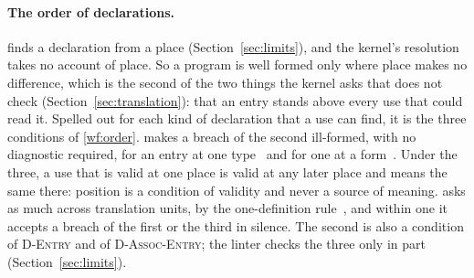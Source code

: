 \paragraph{The order of declarations.}
\label{app:fjlt:order}
\Cpp{} finds a declaration from a place (Section~\ref{sec:limits}), and the kernel's resolution takes no account of place.
So a program is well formed only where place makes no difference, which is the second of the two things the kernel asks that \Cpp{} does not check (Section~\ref{sec:translation}): that an entry stands above every use that could read it.
Spelled out for each kind of declaration that a use can find, it is the three conditions of \ref{wf:order}.
\Cpp{} makes a breach of the second ill-formed, with no diagnostic required, for an entry at one type~\cite[{\texttt{temp.expl.spec}}]{cpp23standard} and for one at a form~\cite[{\texttt{temp.spec.partial}}]{cpp23standard}.
Under the three, a use that is valid at one place is valid at any later place and means the same there: position is a condition of validity and never a source of meaning.
\Cpp{} asks as much across translation units, by the one-definition rule~\cite[{\texttt{basic.def.odr}}]{cpp23standard}, and within one it accepts a breach of the first or the third in silence.
The second is also a condition of \textsc{D-Entry} and of \textsc{D-Assoc-Entry}; the linter checks the three only in part (Section~\ref{sec:limits}).

